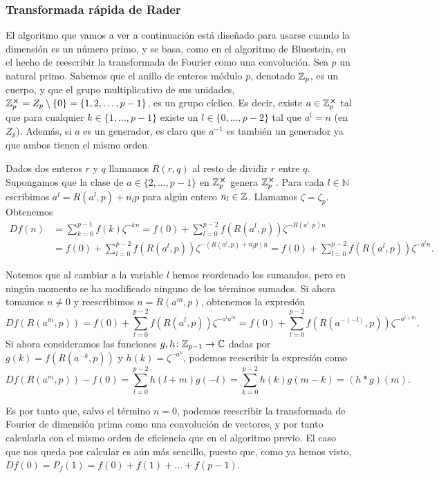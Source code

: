 \documentclass{article}
\begin{document}
\subsubsection{Transformada rápida de Rader}

El algoritmo que vamos a ver a continuación está diseñado para usarse cuando la dimensión es un número primo, y se basa, como en el algoritmo de Bluestein, en el hecho de reescribir la transformada de Fourier como una convolución. Sea $p$ un natural primo. Sabemos que el anillo de enteros módulo $p$, denotado $\mathbb{Z}_p$, es un cuerpo, y que el grupo multiplicativo de sus unidades,  $\mathbb{Z}_p^{\cross} = Z_p \setminus \{0\} = \{1,2,\dots,p-1\}$, es un grupo cíclico. Es decir, existe $a \in \mathbb{Z}_p^{\cross}$ tal que para cualquier $k \in \{1,\dots,p-1\}$ existe un $l \in \{0,\dots,p-2\}$ tal que $a^l = n$ (en $Z_p$). Además, si $a$ es un generador, es claro que $a^{-1}$ es también un generador ya que ambos tienen el mismo orden.

Dados dos enteros $r$ y $q$ llamamos $R(r,q)$ al resto de dividir $r$ entre $q$. Supongamos que la clase de $a \in \{2, \ldots, p-1\}$ en $\mathbb{Z}_p^{\cross}$ genera $\mathbb{Z}_p^{\cross}$. Para cada $l \in \mathbb{N}$ escribimos $a^l = R(a^l,p) + n_l p$ para algún entero $n_l \in \mathbb{Z}$. Llamamos $\zeta = \zeta_p$. Obtenemos
\begin{align*}
    Df(n) &= \sum_{k=0}^{p-1} f(k) \zeta^{-kn} = f(0) + \sum_{l=0}^{p-2}f(R(a^l,p))\zeta^{-R(a^l,p) n} \\
          &= f(0) + \sum_{l=0}^{p-2}f(R(a^l,p))\zeta^{-(R(a^l,p) + n_l p)n} = f(0) + \sum_{l=0}^{p-2}f(R(a^l,p))\zeta^{-a^ln} .
\end{align*} 

Notemos que al cambiar a la variable $l$ hemos reordenado los sumandos, pero en ningún momento se ha modificado ninguno de los términos sumados. Si ahora tomamos $n \ne 0$ y reescribimos $n = R(a^m,p)$, obtenemos la expresión
\[ Df(R(a^m,p)) = f(0) + \sum_{l=0}^{p-2}f(R(a^l,p))\zeta^{-a^la^m} = f(0) + \sum_{l=0}^{p-2}f(R(a^{-(-l)},p))\zeta^{-a^{l+m}}. \]
Si ahora consideramos las funciones $g,h\colon \mathbb{Z}_{p-1} \to \mathbb{C}$ dadas por $g(k) = f(R(a^{-k},p))$ y $h(k) = \zeta^{-a^k}$, podemos reescribir la expresión como
\[ Df(R(a^m,p)) - f(0) = \sum_{l=0}^{p-2}h(l+m)g(-l) = \sum_{k=0}^{p-2}h(k)g(m-k) = (h \ast g)(m).\]

Es por tanto que, salvo el término $n = 0$, podemos reescribir la transformada de Fourier de dimensión prima como una convolución de vectores, y por tanto calcularla con el mismo orden de eficiencia que en el algoritmo previo. El caso que nos queda por calcular es aún más sencillo, puesto que, como ya hemos visto, $Df(0) = P_f(1) = f(0) + f(1) + \dots + f(p-1)$.
\end{document}
